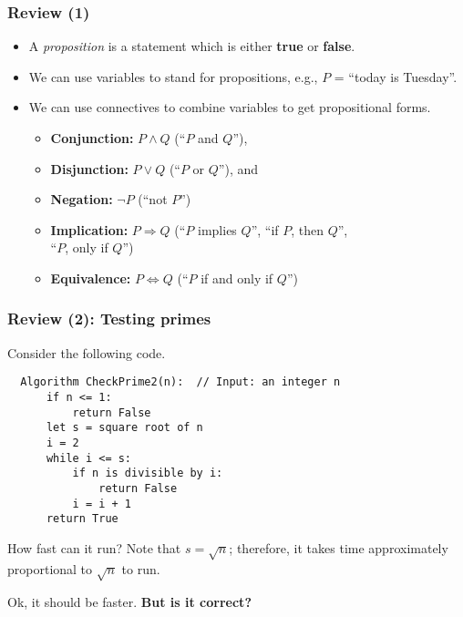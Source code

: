 

\begin{frame}\frametitle{Review (1)}
  \begin{itemize}
  \item A {\em proposition} is a statement which is either {\bf true}
    or {\bf false}.
  \item We can use variables to stand for propositions, e.g., $P$ =
    ``today is Tuesday''.
  \item We can use connectives to combine variables to get
    propositional forms.
    \begin{itemize}
    \item {\bf Conjunction:} $P\wedge Q$ (``$P$ and $Q$''), 
    \item {\bf Disjunction:} $P\vee Q$ (``$P$ or $Q$''), and
    \item {\bf Negation:} $\neg P$ (``not $P$'')
    \item {\bf Implication:} $P\Rightarrow Q$ (``$P$ implies $Q$'', ``if $P$, then $Q$'', \\ ``$P$, only if $Q$'')
    \item {\bf Equivalence:} $P\Leftrightarrow Q$ (``$P$ if and only if $Q$'')
    \end{itemize}
  \end{itemize}
\end{frame}

\begin{frame}[fragile]\frametitle{Review (2): Testing primes}
  Consider the following code.
  
  \begin{tcolorbox}
  {\small
\begin{verbatim}
  Algorithm CheckPrime2(n):  // Input: an integer n
      if n <= 1:
          return False
      let s = square root of n
      i = 2
      while i <= s:
          if n is divisible by i:
              return False
          i = i + 1
      return True
\end{verbatim}
  }
  \end{tcolorbox}
  
  How fast can it run? Note that $s = \sqrt{n}$; therefore, it
  takes time approximately proportional to $\sqrt{n}$ to run.

  Ok, it should be faster.  {\bf But is it correct?}

\end{frame}


